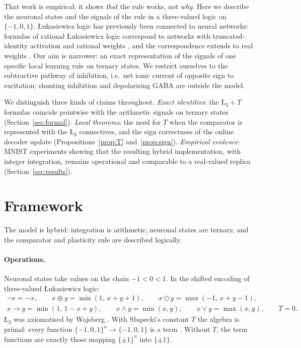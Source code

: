 \documentclass[11pt,a4paper]{article}
\theoremstyle{remark}
\newcommand{\Lt}{\text{\L}_3}
\newcommand{\LtT}{\text{\L}_3{+}T}
\begin{document}
That work is empirical: it shows \emph{that} the rule works, not \emph{why}. Here we describe the neuronal states and the signals of the rule in a three-valued logic on $\{-1,0,1\}$. \L ukasiewicz logic has previously been connected to neural networks: formulas of rational \L ukasiewicz logic correspond to networks with truncated-identity activation and rational weights \cite{amato2002}, and the correspondence extends to real weights \cite{dinola2013}. Our aim is narrower: an exact representation of the signals of one specific local learning rule on ternary states. We restrict ourselves to the subtractive pathway of inhibition, i.e.\ net ionic current of opposite sign to excitation; shunting inhibition and depolarising GABA are outside the model.

We distinguish three kinds of claims throughout. \emph{Exact identities}: the $\LtT$ formulas coincide pointwise with the arithmetic signals on ternary states (Section~\ref{sec:formal}). \emph{Local theorems}: the need for $T$ when the comparator is represented with the $\Lt$ connectives, and the sign correctness of the online decoder update (Propositions~\ref{prop:T} and~\ref{prop:sign}). \emph{Empirical evidence}: MNIST experiments showing that the resulting hybrid implementation, with integer integration, remains operational and comparable to a real-valued replica (Section~\ref{sec:results}).

\section{Framework}\label{sec:framework}

The model is hybrid: integration is arithmetic, neuronal states are ternary, and the comparator and plasticity rule are described logically.

\paragraph{Operations.} Neuronal states take values on the chain $-1<0<1$. In the shifted encoding of three-valued \L ukasiewicz logic:
\begin{gather*}
\neg x = -x,\qquad x\oplus y = \min(1,\,x+y+1),\qquad x\odot y = \max(-1,\,x+y-1),\\
x\to y = \min(1,\,1-x+y),\qquad x\wedge y=\min(x,y),\qquad x\vee y = \max(x,y),\qquad T=0 .
\end{gather*}
$\Lt$ was axiomatised by Wajsberg \cite{wajsberg1931}. With S\l upecki's constant $T$ the algebra is primal: every function $\{-1,0,1\}^n\to\{-1,0,1\}$ is a term \cite{slupecki1936}. Without $T$, the term functions are exactly those mapping $\{\pm1\}^n$ into $\{\pm1\}$.
\end{document}
